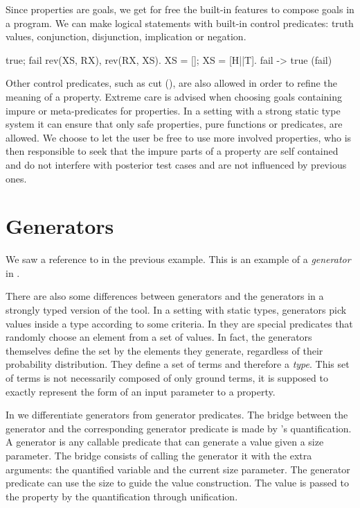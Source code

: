 Since properties are \Prolog{} goals,  we get for free the built-in
features to compose goals in a program.
%
We can make logical statements with built-in control predicates:
truth values, conjunction, disjunction, implication or negation.
%
\begin{yapcode}
   true; fail
   rev(XS, RX), rev(RX, XS).
   XS = []; XS = [H||T].
   fail -> true
   \+(fail)
\end{yapcode}
%
Other control predicates, such as cut (\yap{!}), are also allowed in
order to refine the meaning of a property.
%
Extreme care is advised when choosing goals containing impure or
meta-predicates for properties.
%
In a setting with a strong static type system it can ensure that only
safe properties, pure functions or predicates, are allowed.
%
We choose to let the user be free to use more involved properties, who
is then responsible to seek that the impure parts of a property are self
contained and do not interfere with posterior test cases and are not
influenced by previous ones.


\section{Generators}
\label{sec:generators}

We saw a reference to  in the previous example.
%
This is an example of a \emph{generator} in \plqc{}.



There are also some differences between \plqc{} generators and the
generators in a strongly typed version of the tool.
%
In a setting with static types, generators pick values inside a type
according to some criteria.
%
In \plqc{} they are special predicates that randomly choose an element
from a set of values.
%
In fact, the generators themselves define the set by the elements
they generate, regardless of their probability distribution.
%
They define a set of terms and therefore a \emph{type}.
%
This set of terms is not necessarily composed of only ground terms, it
is supposed to exactly represent the form of an input parameter to a
property.


In \plqc{} we differentiate generators from generator predicates.
%
The bridge between the generator and the corresponding generator
predicate is made by \plqc{}'s quantification.
%
A generator is any callable predicate that can generate a value given a
size parameter.
%
The bridge consists of calling the generator it with the extra
arguments: the quantified variable and the current size parameter.
%
The generator predicate can use the size to guide the value
construction.
%
The value is passed to the property by the \plqc{} quantification
through unification.



